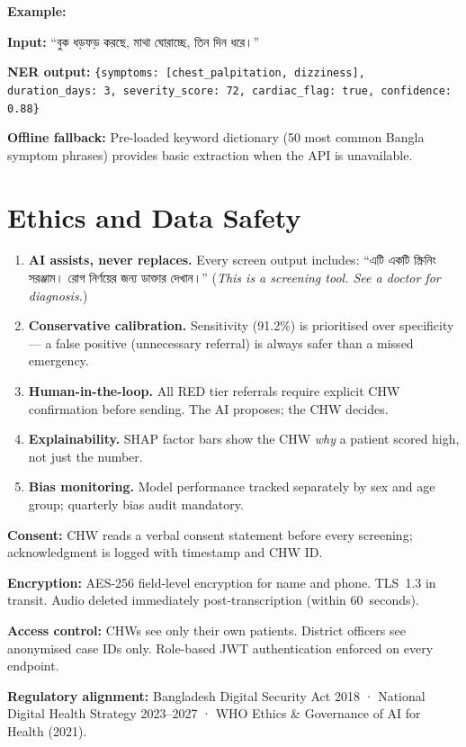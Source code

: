 \documentclass[12pt, a4paper]{article}
\newcommand{\bn}[1]{{\bengalifont #1}}
\newcommand{\code}[1]{\texttt{\small#1}}
\begin{document}
\medskip
\noindent\textbf{Example:}
\begin{tcolorbox}[
  enhanced, arc=3pt, boxrule=0.6pt,
  colback=gray10, colframe=gray30,
  top=8pt, bottom=8pt, left=12pt, right=12pt
]
\small
\textbf{Input:} \bn{``বুক ধড়ফড় করছে, মাথা ঘোরাচ্ছে, তিন দিন ধরে।''}

\textbf{NER output:}
\code{\{symptoms: [chest\_palpitation, dizziness], duration\_days: 3, severity\_score: 72, cardiac\_flag: true, confidence: 0.88\}}
\end{tcolorbox}

\textbf{Offline fallback:} Pre-loaded keyword dictionary (50 most common Bangla symptom phrases) provides basic extraction when the API is unavailable.

\section{Ethics and Data Safety}

\begin{alertbox}
\small
\begin{enumerate}[leftmargin=1.4em]
  \item \textbf{AI assists, never replaces.} Every screen output includes: \bn{``এটি একটি স্ক্রিনিং সরঞ্জাম। রোগ নির্ণয়ের জন্য ডাক্তার দেখান।''} (\textit{This is a screening tool. See a doctor for diagnosis.})
  \item \textbf{Conservative calibration.} Sensitivity (91.2\%) is prioritised over specificity — a false positive (unnecessary referral) is always safer than a missed emergency.
  \item \textbf{Human-in-the-loop.} All RED tier referrals require explicit CHW confirmation before sending. The AI proposes; the CHW decides.
  \item \textbf{Explainability.} SHAP factor bars show the CHW \emph{why} a patient scored high, not just the number.
  \item \textbf{Bias monitoring.} Model performance tracked separately by sex and age group; quarterly bias audit mandatory.
\end{enumerate}
\end{alertbox}

\begin{infobox}
\small
\textbf{Consent:} CHW reads a verbal consent statement before every screening; acknowledgment is logged with timestamp and CHW ID.

\medskip
\textbf{Encryption:} AES-256 field-level encryption for name and phone. TLS~1.3 in transit. Audio deleted immediately post-transcription (within 60~seconds).

\medskip
\textbf{Access control:} CHWs see only their own patients. District officers see anonymised case IDs only. Role-based JWT authentication enforced on every endpoint.

\medskip
\textbf{Regulatory alignment:} Bangladesh Digital Security Act 2018 · National Digital Health Strategy 2023--2027 · WHO Ethics \& Governance of AI for Health (2021).
\end{infobox}
\end{document}
